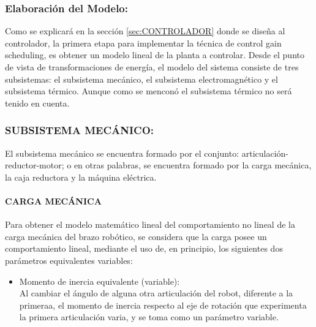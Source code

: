 \documentclass{article}
\begin{document}
\begin{sloppypar}
\subsubsection{Elaboración del Modelo:}
\label{sec:Elaboración del Modelo:}

Como se explicará en la sección \ref{sec:CONTROLADOR} donde se diseña al controlador, la primera etapa para implementar la técnica de control gain scheduling, es obtener un modelo lineal de la planta a controlar.
Desde el punto de vista de transformaciones de energía, el modelo del sistema consiste de tres subsistemas: el subsistema mecánico, el subsistema electromagnético y el subsistema térmico. Aunque como se menconó el subsistema térmico no será tenido en cuenta.

\subsubsection{SUBSISTEMA MECÁNICO:}
\label{sec:SUBSISTEMA MECÁNICO:}

El subsistema mecánico se encuentra formado por el conjunto: articulación-reductor-motor; o en otras palabras, se encuentra formado por la carga mecánica, la caja reductora y la máquina eléctrica.

\paragraph{\textbf{CARGA MECÁNICA}}
\label{sec:CARGA MECÁNICA}
\hfill

\hfill

Para obtener el modelo matemático lineal del comportamiento no lineal de la carga mecánica del brazo robótico, se considera que
la carga posee un comportamiento lineal, mediante el uso de, en principio, los siguientes dos parámetros equivalentes variables:
\begin{itemize}
    \item Momento de inercia equivalente (variable):
    \\ Al cambiar el ángulo de alguna otra articulación del robot, diferente a la primeraa, el momento de inercia respecto al eje de rotación que experimenta la primera articulación varia, y se toma como un parámetro variable.


\end{itemize}
\end{sloppypar}
\end{document}
